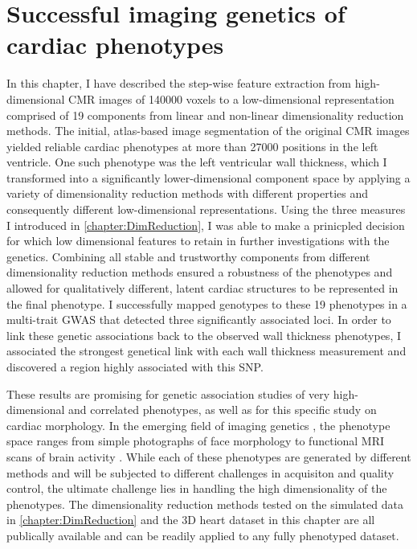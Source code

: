 \newpage
\section{Successful imaging genetics of cardiac phenotypes}
In this chapter, I have described the step-wise feature extraction from high-dimensional CMR images of \num{140000} voxels to a low-dimensional  representation comprised of \num{19} components from linear and non-linear dimensionality reduction methods. The initial, atlas-based image segmentation of the original CMR images yielded reliable cardiac phenotypes at more than \num{27000} positions in the left ventricle. One such phenotype was the left ventricular wall thickness, which I transformed into a significantly lower-dimensional component space by applying a variety of dimensionality reduction methods with different properties and consequently different low-dimensional representations. Using the three measures I introduced in \cref{chapter:DimReduction}, I was able to make a prinicpled decision for which low dimensional features to retain in further investigations with the genetics. Combining all stable and trustworthy components from different dimensionality reduction methods ensured a robustness of the phenotypes and allowed for qualitatively different, latent cardiac structures to be represented in the final phenotype. I successfully mapped genotypes to these \num{19} phenotypes in a multi-trait GWAS that detected three significantly associated loci. In order to link these genetic associations back to the observed wall thickness phenotypes, I associated the strongest genetical link with each wall thickness measurement and discovered a region highly associated with this SNP.  

These results are promising for genetic association studies of very high-dimensional and correlated phenotypes, as well as for this specific study on cardiac morphology. In the emerging field of imaging genetics \citep{Ge2014}, the phenotype space ranges from simple photographs of face morphology \citep{Liu2012,Shaffer2016} to  functional MRI scans of brain activity  \citep{Stein2010,HIbar2015}. While each of these phenotypes are generated by different methods and will be subjected to different challenges in acquisiton and quality control, the ultimate challenge lies in handling the high dimensionality of the phenotypes. The dimensionality reduction methods tested on the simulated data in \cref{chapter:DimReduction} and the 3D heart dataset in this chapter are all publically available and can be readily applied to any fully phenotyped dataset. 

